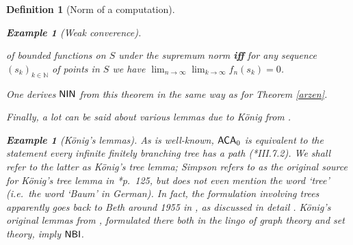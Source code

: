 \documentclass[reqno]{amsart}
\newtheorem{defi}[thm]{Definition}
\newtheorem{exa}[thm]{Example}
\def\ZFC{\textup{\textsf{ZFC}}}
\def\ZF{\textup{\textsf{ZF}}}
\def\RCAo{\textup{\textsf{RCA}}_{0}^{\omega}}
\def\N{{\mathbb  N}}
\def\R{{\mathbb  R}}
\def\di{\rightarrow}
\def\ACA{\textup{\textsf{ACA}}}
\def\QFAC{\textup{\textsf{QF-AC}}}
\def\NCC{\textup{\textsf{NCC}}}
\def\NBI{\textup{\textsf{NBI}}}
\def\NIN{\textup{\textsf{NIN}}}
\numberwithin{equation}{section}
\numberwithin{thm}{section}
\begin{document}
\begin{defi}[Norm of a computation]
\begin{exa}[Weak converence]
\begin{center}
{of bounded functions on $S$ under the supremum norm \textbf{\textup{iff}} for any sequence $(s_{k})_{k\in \N}$ of points in $S$ we have $\lim_{n\di \infty}\lim_{k\di \infty}f_{n}(s_{k})=0$.}
\end{center}
One derives $\NIN$ from this theorem in the same way as for Theorem \ref{arzen}.
\end{exa}
Finally, a lot can be said about various lemmas due to K\"onig from \cite{koning147}.
\begin{exa}[K\"onig's lemmas]\label{takethat}\rm
As is well-known, $\ACA_{0}$ is equivalent to the statement \emph{every infinite finitely branching tree has a path} (\cite{simpson2}*{III.7.2}).  
We shall refer to the latter as \emph{K\"onig's tree lemma}; Simpson refers to \cite{koning147} as the original source for K\"onig's tree lemma in \cite{simpson2}*{p.\ 125}, but \cite{koning147} does not even mention the word `tree' (i.e.\ the word `Baum' in German).  In fact, the formulation involving trees apparently goes back to Beth around 1955 in \cite{bethweter}, as discussed in detail \cite{wever}.  
K\"onig's original lemmas from \cite{koning147}, formulated there both in the lingo of graph theory and set theory, imply $\NBI$.  
\end{exa}

\end{defi}
\end{document}
